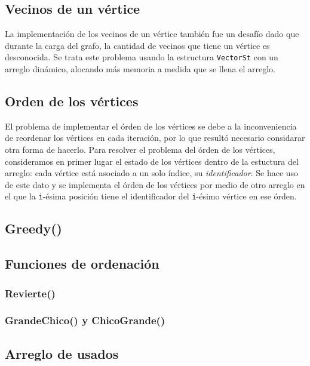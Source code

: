 \documentclass[11pt,a4paper]{article}
\theoremstyle{plain}
\begin{document}
	\subsection{Vecinos de un vértice}

La implementación de los vecinos de un vértice también fue un desafío dado que durante la carga del grafo, la cantidad de vecinos que tiene un vértice es desconocida. Se trata este problema usando la estructura \texttt{VectorSt} con un arreglo dinámico, alocando más memoria a medida que se llena el arreglo.

	\subsection{Orden de los vértices}

El problema de implementar el órden de los vértices se debe a la inconveniencia de reordenar los vértices en cada iteración, por lo que resultó necesario considarar otra forma de hacerlo. Para resolver el problema del órden de los vértices, consideramos en primer lugar el estado de los vértices dentro de la estuctura del arreglo: cada vértice está asociado a un solo índice, su \emph{identificador}. Se hace uso de este dato y se implementa el órden de los vértices por medio de otro arreglo en el que la \texttt{i}-ésima posición tiene el identificador del \texttt{i}-ésimo vértice en ese órden.

	\subsection{Greedy()}


	\subsection{Funciones de ordenación}

		\subsubsection{Revierte()}

		\subsubsection{GrandeChico() y ChicoGrande()}

	\subsection{Arreglo de usados}
	\label{sec:7.6}
\end{document}
